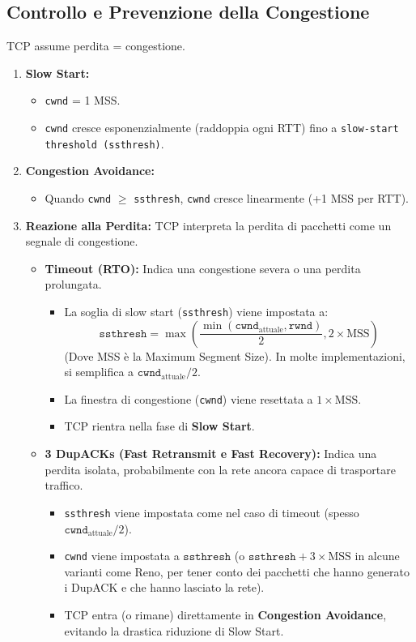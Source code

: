 \subsection{Controllo e Prevenzione della Congestione}
TCP assume perdita = congestione.
\begin{enumerate}
    \item \textbf{Slow Start:}
    \begin{itemize}
        \item \texttt{cwnd} = 1 MSS.
        \item \texttt{cwnd} cresce esponenzialmente (raddoppia ogni RTT) fino a \texttt{slow-start threshold (ssthresh)}.
    \end{itemize}
    \item \textbf{Congestion Avoidance:}
    \begin{itemize}
        \item Quando \texttt{cwnd} $\ge$ \texttt{ssthresh}, \texttt{cwnd} cresce linearmente (+1 MSS per RTT).
    \end{itemize}
    \item \textbf{Reazione alla Perdita:} TCP interpreta la perdita di pacchetti come un segnale di congestione.
    \begin{itemize}
        \item \textbf{Timeout (RTO):} Indica una congestione severa o una perdita prolungata.
        \begin{itemize}
            \item La soglia di slow start (\texttt{ssthresh}) viene impostata a:
                \[ \texttt{ssthresh} = \max\left(\frac{\min(\texttt{cwnd}_{\text{attuale}}, \texttt{rwnd})}{2}, 2 \times \text{MSS}\right) \]
                (Dove MSS è la Maximum Segment Size). In molte implementazioni, si semplifica a $\texttt{cwnd}_{\text{attuale}}/2$.
            \item La finestra di congestione (\texttt{cwnd}) viene resettata a $1 \times \text{MSS}$.
            \item TCP rientra nella fase di \textbf{Slow Start}.
        \end{itemize}
        \item \textbf{3 DupACKs (Fast Retransmit e Fast Recovery):} Indica una perdita isolata, probabilmente con la rete ancora capace di trasportare traffico.
        \begin{itemize}
            \item \texttt{ssthresh} viene impostata come nel caso di timeout (spesso $\texttt{cwnd}_{\text{attuale}}/2$).
            \item \texttt{cwnd} viene impostata a $\texttt{ssthresh}$ (o $\texttt{ssthresh} + 3 \times \text{MSS}$ in alcune varianti come Reno, per tener conto dei pacchetti che hanno generato i DupACK e che hanno lasciato la rete).
            \item TCP entra (o rimane) direttamente in \textbf{Congestion Avoidance}, evitando la drastica riduzione di Slow Start.
        \end{itemize}
    \end{itemize}
\end{enumerate}


